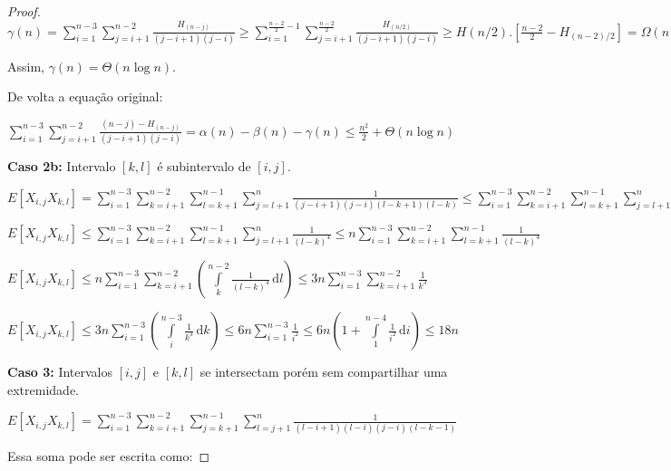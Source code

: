 \documentclass[12pt]{article}
\begin{document}
\begin{proof}
$\gamma(n) =  \sum\limits_{i=1}^{n-3} \sum\limits_{j=i+1}^{n-2} \frac{H_{(n - j)}} {(j-i+1)(j-i)}
\geq  \sum\limits_{i=1}^{\frac{n-2}{2} - 1} \sum\limits_{j=i+1}^{\frac{n-2}{2}} \frac{H_{(n/2)}} {(j-i+1)(j-i)}
\geq  H(n/2) . \left[\frac{n-2}{2} - H_{(n-2)/2} \right] = \Omega(n \log n) $

Assim, $\gamma(n) = \Theta(n \log n)$.


De volta a equação original:

$\sum\limits_{i=1}^{n-3} \sum\limits_{j=i+1}^{n-2} \frac{(n - j) - H_{(n - j)}} {(j-i+1)(j-i)} 
= \alpha(n) - \beta(n) - \gamma(n)
\leq  \frac{n^2}{2} + \Theta(n \log n)$

\vspace{0.5cm}

{\bf Caso 2b:} Intervalo $[k, l]$ é subintervalo de $[i, j]$.

$E[X_{i,j} X_{k,l}] = \sum\limits_{i=1}^{n-3} \sum\limits_{k=i+1}^{n-2}
\sum\limits_{l=k+1}^{n-1} \sum\limits_{j=l+1}^{n} \frac{1}{(j-i+1)(j-i)(l-k+1)(l-k)}
\leq  \sum\limits_{i=1}^{n-3} \sum\limits_{k=i+1}^{n-2}
\sum\limits_{l=k+1}^{n-1} \sum\limits_{j=l+1}^{n} \frac{1}{(l-k+1)(l-k)(l-k+1)(l-k)}$

$E[X_{i,j} X_{k,l}] \leq\sum\limits_{i=1}^{n-3} \sum\limits_{k=i+1}^{n-2}
\sum\limits_{l=k+1}^{n-1} \sum\limits_{j=l+1}^{n} \frac{1}{(l-k)^4}
\leq n \sum\limits_{i=1}^{n-3} \sum\limits_{k=i+1}^{n-2}
\sum\limits_{l=k+1}^{n-1}  \frac{1}{(l-k)^4} $

$E[X_{i,j} X_{k,l}] \leq n \sum\limits_{i=1}^{n-3} \sum\limits_{k=i+1}^{n-2}
\left( \displaystyle \int\limits_{k}^{n-2} \! \frac{1}{(l-k)^4} \, \mathrm{d}l \right)
\leq 3n \sum\limits_{i=1}^{n-3} \sum\limits_{k=i+1}^{n-2} \frac{1}{k^3} $

$E[X_{i,j} X_{k,l}]  \leq 3n \sum\limits_{i=1}^{n-3}
\left( \displaystyle \int\limits_{i}^{n-3} \! \frac{1}{k^3} \, \mathrm{d}k \right)
\leq 6n \sum\limits_{i=1}^{n-3} \frac{1}{i^2}
 \leq 6n \left( 1 + \displaystyle \int\limits_{1}^{n-4} \! \frac{1}{i^2} \, \mathrm{d}i \right)
 \leq 18n$

\vspace{0.5cm}

{\bf Caso 3:} Intervalos $[i, j]$ e $[k, l]$ se intersectam porém sem compartilhar uma extremidade.

$E[X_{i,j} X_{k,l}] = \sum\limits_{i=1}^{n-3} \sum\limits_{k=i+1}^{n-2}
\sum\limits_{j=k+1}^{n-1} \sum\limits_{l=j+1}^{n} \frac{1}{(l-i+1)(l-i)(j-i)(l-k-1)}$

Essa soma pode ser escrita como:


\end{proof}
\end{document}
